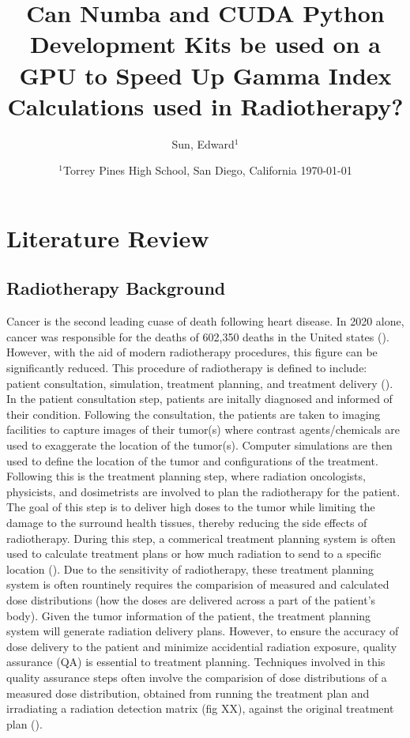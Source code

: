 \documentclass[12pt]{article}
\author{
  Sun, Edward$^{1}$
}
\date{%
  $^{1}$Torrey Pines High School, San Diego, California
  \today
}
\begin{document}
\title{Can Numba and CUDA Python Development Kits be used on a GPU to Speed Up Gamma Index Calculations used in Radiotherapy?}

\section{Literature Review}
\subsection{Radiotherapy Background}
Cancer is the second leading cuase of death following heart disease. In 2020 alone, cancer was responsible for the deaths of 602,350 deaths in the United states (\textcite{CDC}). However, with the aid of modern radiotherapy procedures, this figure can be significantly reduced. This procedure of radiotherapy is defined to include: patient consultation, simulation, treatment planning, and treatment delivery (\textcite{SBU}). In the patient consultation step, patients are initally diagnosed and informed of their condition. Following the consultation, the patients are taken to imaging facilities to capture images of their tumor(s) where contrast agents/chemicals are used to exaggerate the location of the tumor(s). Computer simulations are then used to define the location of the tumor and configurations of the treatment. Following this is the treatment planning step, where radiation oncologists, physicists, and dosimetrists are involved to plan the radiotherapy for the patient. The goal of this step is to deliver high doses to the tumor while limiting the damage to the surround health tissues, thereby reducing the side effects of radiotherapy. During this step, a commerical treatment planning system is often used to calculate treatment plans or how much radiation to send to a specific location (\textcite{Gardner}). Due to the sensitivity of radiotherapy, these treatment planning system is often rountinely requires the comparision of measured and calculated dose distributions (how the doses are delivered across a part of the patient's body). Given the tumor information of the patient, the treatment planning system will generate radiation delivery plans. However, to ensure the accuracy of dose delivery to the patient and minimize accidential radiation exposure, quality assurance (QA) is essential to treatment planning. Techniques involved in this quality assurance steps often involve the comparision of dose distributions of a measured dose distribution, obtained from running the treatment plan and irradiating a radiation detection matrix (fig XX), against the original treatment plan (\textcite{Low}).
\end{document}
